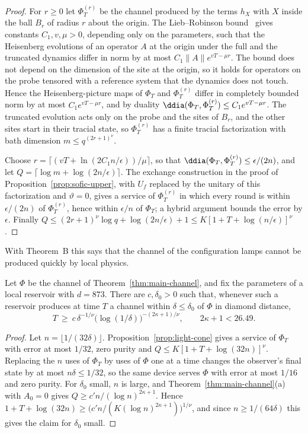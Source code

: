 \begin{proof}
For $r\ge0$ let $\Phi_T^{(r)}$ be the channel produced by the terms $h_X$ with $X$ inside the ball $B_r$ of radius $r$ about the origin. The
Lieb--Robinson bound~\cite{LiebRobinson1972,BHV2006,NSY2019} gives constants $C_1,v,\mu>0$, depending only on the parameters, such that the Heisenberg
evolutions of an operator $A$ at the origin under the full and the truncated dynamics differ in norm by at most $C_1\|A\|e^{vT-\mu r}$. The bound
does not depend on the dimension of the site at the origin, so it holds for operators on the probe tensored with a reference system that the
dynamics does not touch. Hence the Heisenberg-picture maps of $\Phi_T$ and $\Phi_T^{(r)}$ differ in completely bounded norm by at most
$C_1e^{vT-\mu r}$, and by duality $\ddia(\Phi_T,\Phi_T^{(r)})\le C_1e^{vT-\mu r}$. The truncated evolution acts only on the probe and the sites
of $B_r$, and the other sites start in their tracial state, so $\Phi_T^{(r)}$ has a finite tracial factorization with bath dimension
$m\le q^{(2r+1)^\nu}$.

Choose $r=\lceil(vT+\ln(2C_1n/\epsilon))/\mu\rceil$, so that $\ddia(\Phi_T,\Phi_T^{(r)})\le\epsilon/(2n)$, and let $Q=\lceil\log m+\log(2n/\epsilon)\rceil$.
The exchange construction in the proof of Proposition~\ref{prop:sofic-upper}, with $U_f$ replaced by the unitary of this factorization and
$\vartheta=0$, gives a service of $\Phi_T^{(r)}$ in which every round is within $\epsilon/(2n)$ of $\Phi_T^{(r)}$, hence within $\epsilon/n$ of
$\Phi_T$; a hybrid argument bounds the error by $\epsilon$. Finally $Q\le(2r+1)^\nu\log q+\log(2n/\epsilon)+1\le K[1+T+\log(n/\epsilon)]^\nu$.
\end{proof}

With Theorem~B this says that the channel of the configuration lamps cannot be produced quickly by local physics.

\begin{corollary}\label{cor:preparation}
Let $\Phi$ be the channel of Theorem~\ref{thm:main-channel}, and fix the parameters of a local reservoir with $d=873$. There are $c,\delta_0>0$ such
that, whenever such a reservoir produces at time $T$ a channel within $\delta\le\delta_0$ of $\Phi$ in diamond distance,
\[
T\ \ge\ c\,\delta^{-1/\nu}\bigl(\log(1/\delta)\bigr)^{-(2\kappa+1)/\nu},\qquad 2\kappa+1<26.49 .
\]
\end{corollary}

\begin{proof}
Let $n=\lfloor1/(32\delta)\rfloor$. Proposition~\ref{prop:light-cone} gives a service of $\Phi_T$ with error at most $1/32$, zero purity and
$Q\le K[1+T+\log(32n)]^\nu$. Replacing the $n$ uses of $\Phi_T$ by uses of $\Phi$ one at a time changes the observer's final state by at most
$n\delta\le1/32$, so the same device serves $\Phi$ with error at most $1/16$ and zero purity. For $\delta_0$ small, $n$ is large, and
Theorem~\ref{thm:main-channel}(a) with $A_0=0$ gives $Q\ge c'n/(\log n)^{2\kappa+1}$. Hence
$1+T+\log(32n)\ge\bigl(c'n/(K(\log n)^{2\kappa+1})\bigr)^{1/\nu}$, and since $n\ge1/(64\delta)$ this gives the claim for $\delta_0$ small.
\end{proof}

